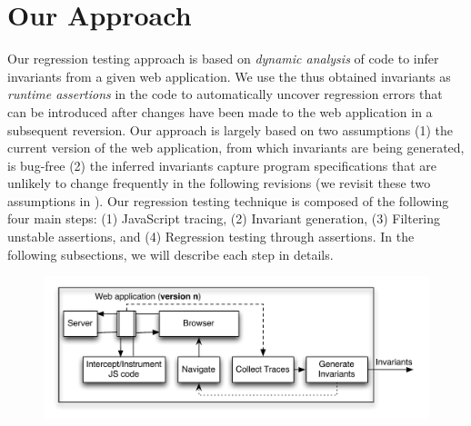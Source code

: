 \section{Our Approach}
\label{Sec:approach}
\vspace{-3pt}
Our regression testing approach is based on \emph{dynamic analysis} of \javascript code to infer invariants from a given web application. 
We use the thus obtained invariants as \emph{runtime assertions} in the \javascript code to automatically uncover regression errors that can be introduced after 
changes have been made to the web application in a subsequent reversion. Our approach is largely based on two assumptions (1) the current version of the web application, 
from which invariants are being generated, is bug-free (2) the inferred invariants capture program specifications that are unlikely to change frequently in the following revisions (we revisit these two assumptions in ).
Our regression testing technique is composed of the following four main steps: (1) JavaScript tracing, (2) Invariant generation, (3) Filtering unstable assertions, and (4) Regression testing through assertions. In the following subsections, we will describe each step in details.


%

\begin{figure}[t]
\centering
\includegraphics[width=0.9\hsize]{fig/approach-view}
\label{Fig:invariantDetectionDiagram}
\end{figure}



